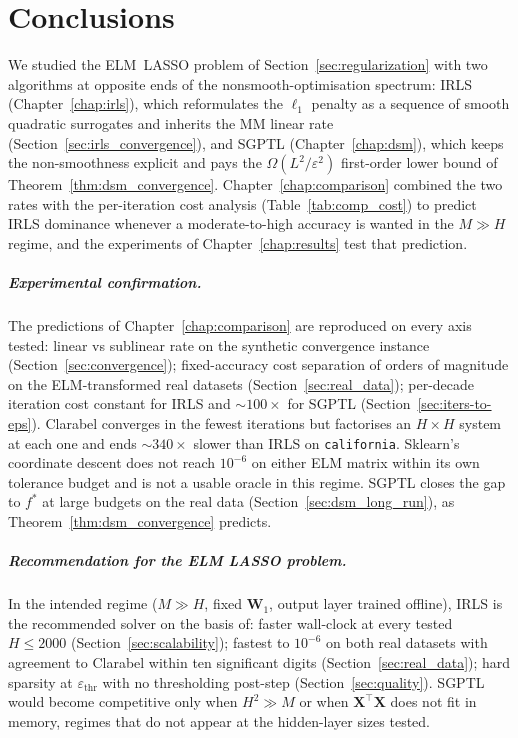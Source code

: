 \chapter{Conclusions}
\label{chap:conclusions}

We studied the ELM~LASSO problem of
Section~\ref{sec:regularization} with two algorithms at opposite ends
of the nonsmooth-optimisation spectrum: IRLS
(Chapter~\ref{chap:irls}), which reformulates the $\ell_{1}$ penalty as
a sequence of smooth quadratic surrogates and inherits the MM linear
rate (Section~\ref{sec:irls_convergence}), and SGPTL
(Chapter~\ref{chap:dsm}), which keeps the non-smoothness explicit and
pays the $\Omega(L^{2}/\varepsilon^{2})$ first-order lower bound of
Theorem~\ref{thm:dsm_convergence}. Chapter~\ref{chap:comparison}
combined the two rates with the per-iteration cost analysis
(Table~\ref{tab:comp_cost}) to predict IRLS dominance whenever a
moderate-to-high accuracy is wanted in the $M\gg H$ regime, and the
experiments of Chapter~\ref{chap:results} test that prediction.

\paragraph{Experimental confirmation.}
The predictions of Chapter~\ref{chap:comparison} are reproduced on
every axis tested: linear vs sublinear rate on the synthetic
convergence instance (Section~\ref{sec:convergence}); fixed-accuracy
cost separation of orders of magnitude on the ELM-transformed real
datasets (Section~\ref{sec:real_data}); per-decade iteration cost
constant for IRLS and $\sim\!100\times$ for SGPTL
(Section~\ref{sec:iters-to-eps}). Clarabel converges in the fewest
iterations but factorises an $H\!\times\!H$ system at each one and
ends $\sim\!340\times$ slower than IRLS on \texttt{california}.
Sklearn's coordinate descent does not reach $10^{-6}$ on either ELM
matrix within its own tolerance budget and is not a usable oracle in
this regime. SGPTL closes the gap to $f^{*}$ at large budgets on the
real data (Section~\ref{sec:dsm_long_run}), as
Theorem~\ref{thm:dsm_convergence} predicts.

\paragraph{Recommendation for the ELM LASSO problem.}
In the intended regime ($M\gg H$, fixed $\mathbf{W}_{1}$, output layer
trained offline), IRLS is the recommended solver on the basis of:
faster wall-clock at every tested $H\le 2000$
(Section~\ref{sec:scalability}); fastest to $10^{-6}$ on both real
datasets with agreement to Clarabel within ten significant digits
(Section~\ref{sec:real_data}); hard sparsity at $\varepsilon_\text{thr}$
with no thresholding post-step (Section~\ref{sec:quality}). SGPTL would
become competitive only when $H^{2}\gg M$ or when
$\mathbf{X}^{\top}\mathbf{X}$ does not fit in memory, regimes that do
not appear at the hidden-layer sizes tested.

